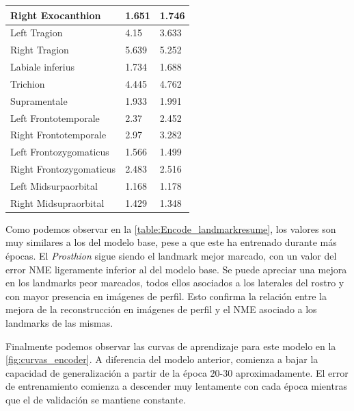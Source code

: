 \begin{table}[!ht]
\begin{tabular}{|l|l|l|}
                Right Exocanthion & \cellcolor{green!25}1.651 & 1.746 \\ \hline
                Left Tragion & 4.15 & \cellcolor{green!25}3.633 \\ \hline
                Right Tragion & 5.639 & \cellcolor{green!25}5.252 \\ \hline
                Labiale inferius & 1.734 & \cellcolor{green!25}1.688 \\ \hline
                Trichion & \cellcolor{green!25}4.445 & 4.762 \\ \hline
                Supramentale & \cellcolor{green!25}1.933 & 1.991 \\ \hline
                Left Frontotemporale & \cellcolor{green!25}2.37 & 2.452 \\ \hline
                Right Frontotemporale & \cellcolor{green!25}2.97 & 3.282 \\ \hline
                Left Frontozygomaticus & 1.566 & \cellcolor{green!25}1.499 \\ \hline
                Right Frontozygomaticus & \cellcolor{green!25}2.483 & 2.516 \\ \hline
                Left Midsurpaorbital & \cellcolor{green!25}1.168 & 1.178 \\ \hline
                Right Midsupraorbital & 1.429 & \cellcolor{green!25}1.348 \\ \hline
            \end{tabular}
            \label{table:Encode_landmarkresume}
        \end{table}

    \noindent Como podemos observar en la \autoref{table:Encode_landmarkresume}, los valores son muy similares a los del modelo base, pese a que este ha entrenado durante más épocas. El \textit{Prosthion} sigue siendo el landmark mejor marcado, con un valor del error NME ligeramente inferior al del modelo base. Se puede apreciar una mejora en los landmarks peor marcados, todos ellos asociados a los laterales del rostro y con mayor presencia en imágenes de perfil. Esto confirma la relación entre la mejora de la reconstrucción en imágenes de perfil y el NME asociado a los landmarks de las mismas.
    

    \medskip

    \noindent Finalmente podemos observar las curvas de aprendizaje para este modelo en la \autoref{fig:curvas_encoder}. A diferencia del modelo anterior, comienza a bajar la capacidad de generalización a partir de la época $20$-$30$ aproximadamente. El error de entrenamiento comienza a descender muy lentamente con cada época mientras que el de validación se mantiene constante.

